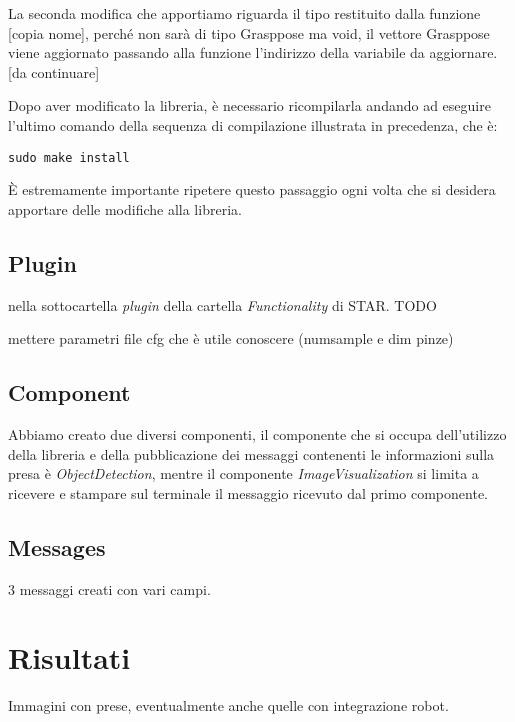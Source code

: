 \documentclass{report}
\begin{document}
La seconda modifica che apportiamo riguarda il tipo restituito dalla funzione [copia nome], perché non sarà di tipo Grasppose ma void, il vettore Grasppose viene aggiornato passando alla funzione l'indirizzo della variabile da aggiornare. [da continuare]\par 
Dopo aver modificato la libreria, è necessario ricompilarla andando ad eseguire l'ultimo comando della sequenza di compilazione illustrata in precedenza, che è: 
\begin{verbatim}
sudo make install
\end{verbatim}
È estremamente importante ripetere questo passaggio ogni volta che si desidera apportare delle modifiche alla libreria.
\section{Plugin}
nella sottocartella \textit{plugin} della cartella \textit{Functionality} di STAR. TODO  \par
mettere parametri file cfg che è utile conoscere (numsample e dim pinze)
\section{Component}
Abbiamo creato due diversi componenti, il componente che si occupa dell'utilizzo della libreria e della pubblicazione dei messaggi contenenti le informazioni sulla presa è \textit{ObjectDetection}, mentre il componente \textit{ImageVisualization} si limita a ricevere e stampare sul terminale il messaggio ricevuto dal primo componente.
\section{Messages}
3 messaggi creati con vari campi.

\newpage
\chapter{Risultati}\label{risultati}
Immagini con prese, eventualmente anche quelle con integrazione robot.
\end{document}
